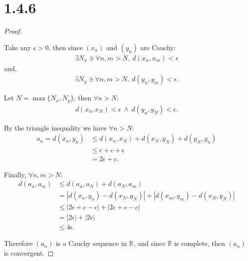 \documentclass{article}
\begin{document}
\section*{1.4.6}
\begin{proof}
  $ $

  Take any $\epsilon > 0$, then since $(x_n)$ and $(y_n)$ are Cauchy:
  \begin{align*}
    \exists N_x \ni \forall n,m > N, \: d(x_n, x_m) < \epsilon
  \end{align*}
  and,
  \begin{align*}
    \exists N_y \ni \forall n,m > N, \: d(y_n, y_m) < \epsilon.
  \end{align*}

  Let $N = \max \lbrace N_x, N_y \rbrace$, then $\forall n > N$:
  \begin{align*}
    d(x_n, x_N) < \epsilon \: \land \: d(y_n, y_N) < \epsilon.
  \end{align*}

  By the triangle inequality we have $\forall n > N$:
  \begin{align*}
    a_n = d(x_n, y_n) &\leq d(x_n, x_N) + d(x_N, y_N) + d(y_N, y_n) \\
    &\leq \epsilon + c + \epsilon \\
    &=  2\epsilon + c.
  \end{align*}

  Finally, $\forall n,m > N$:
  \begin{align*}
    d(a_n, a_m) &\leq d(a_n, a_N) + d(a_N, a_m) \\
    &= |d(x_n, y_n) - d(x_N, y_N)| + |d(x_m, y_m) - d(x_N, y_N)| \\
    &\leq |2\epsilon + c - c| + |2\epsilon + c - c| \\
    &= |2\epsilon| + |2\epsilon| \\
    &\leq 4\epsilon.
  \end{align*}

  Therefore $(a_n)$ is a Cauchy sequence in $\mathbb{R}$,
  and since $\mathbb{R}$ is complete, then $(a_n)$ is convergent.

\end{proof}

\newpage
\end{document}
